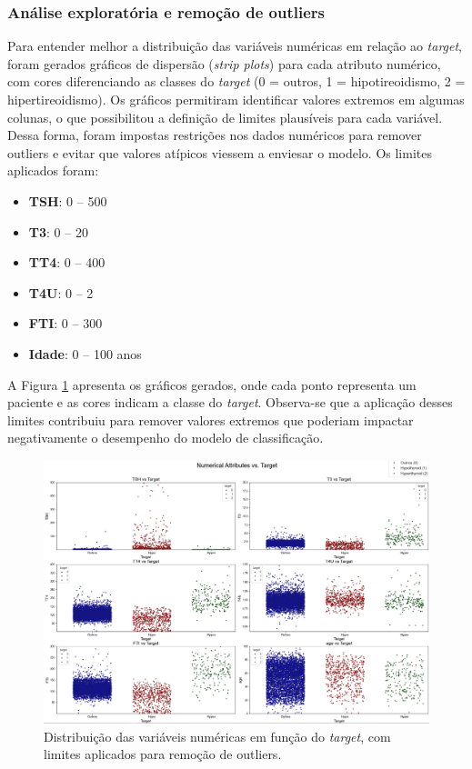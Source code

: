 \documentclass[11pt]{article}
\begin{document}
\subsubsection{Análise exploratória e remoção de outliers}

Para entender melhor a distribuição das variáveis numéricas em relação ao \textit{target}, foram gerados gráficos de dispersão (\textit{strip plots}) para cada atributo numérico, com cores diferenciando as classes do \textit{target} (0 = outros, 1 = hipotireoidismo, 2 = hipertireoidismo). 
Os gráficos permitiram identificar valores extremos em algumas colunas, o que possibilitou a definição de limites plausíveis para cada variável. Dessa forma, foram impostas restrições nos dados numéricos para remover outliers e evitar que valores atípicos viessem a enviesar o modelo. Os limites aplicados foram:

\begin{itemize}
    \item \textbf{TSH}: 0 -- 500
    \item \textbf{T3}: 0 -- 20
    \item \textbf{TT4}: 0 -- 400
    \item \textbf{T4U}: 0 -- 2
    \item \textbf{FTI}: 0 -- 300
    \item \textbf{Idade}: 0 -- 100 anos
\end{itemize}

A Figura \ref{fig:stripplots} apresenta os gráficos gerados, onde cada ponto representa um paciente e as cores indicam a classe do \textit{target}. Observa-se que a aplicação desses limites contribuiu para remover valores extremos que poderiam impactar negativamente o desempenho do modelo de classificação.

\begin{figure}[H]
    \centering
    \includegraphics[width=1.0\textwidth]{img/numerical_stripplots.png}
    \caption{Distribuição das variáveis numéricas em função do \textit{target}, com limites aplicados para remoção de outliers.}
    \label{fig:stripplots}
\end{figure}
\end{document}
